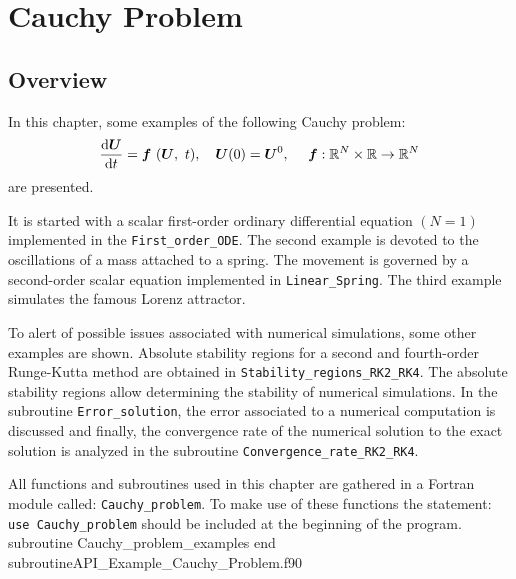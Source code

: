 
    
 \chapter{Cauchy Problem  }
    \label{User:Cauchy_Problem}
\section{Overview}

In this chapter, some examples of the following Cauchy problem: 
\begin{equation*}
\frac{\text{d}\vect{U}}{\text{d}t}=\vect{f}\ (\vect{U},\ t), \quad  \vect{U}(0) =\vect{U}^0,  \ 
\quad \vect{f}:\mathbb{R}^{N} \times\mathbb{R} \rightarrow \mathbb{R}^{N}
\end{equation*}
are presented. 

It is started with a scalar    first-order ordinary differential equation $( N = 1) $ implemented in the
\verb|First_order_ODE|. The second example is devoted to the oscillations of a mass attached to a spring. The movement is governed by a second-order scalar equation implemented in \verb|Linear_Spring|.
The third example simulates the famous Lorenz attractor. 

To alert of possible issues associated with numerical simulations, some other examples are shown. 
Absolute stability regions for a second and fourth-order Runge-Kutta method are obtained in \verb|Stability_regions_RK2_RK4|. The absolute stability regions allow determining the stability of numerical simulations. 
In the subroutine \verb|Error_solution|, the error associated to a numerical computation is discussed and finally, the convergence rate of the numerical solution to the exact solution is analyzed in the subroutine \verb|Convergence_rate_RK2_RK4|.  

All functions and subroutines used in this chapter are gathered in a Fortran module called: \verb|Cauchy_problem|. To make use of these functions the statement: 
\verb|use Cauchy_problem|
should be included at the beginning of the program.
       \vspace{0.5cm} 
       {subroutine Cauchy_problem_examples}
       {end subroutine}{API_Example_Cauchy_Problem.f90}
       
        
       
